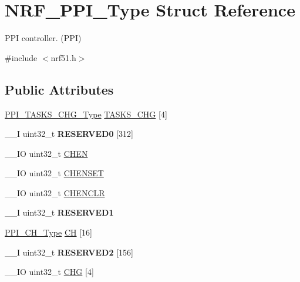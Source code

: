 \hypertarget{struct_n_r_f___p_p_i___type}{}\section{N\+R\+F\+\_\+\+P\+P\+I\+\_\+\+Type Struct Reference}
\label{struct_n_r_f___p_p_i___type}


P\+P\+I controller. (P\+P\+I)  




{\ttfamily \#include $<$nrf51.\+h$>$}

\subsection*{Public Attributes}
\begin{DoxyCompactItemize}
\item 
\hyperlink{struct_p_p_i___t_a_s_k_s___c_h_g___type}{P\+P\+I\+\_\+\+T\+A\+S\+K\+S\+\_\+\+C\+H\+G\+\_\+\+Type} \hyperlink{struct_n_r_f___p_p_i___type_a16a82ced7f5dfaf384b24f08e41b8407}{T\+A\+S\+K\+S\+\_\+\+C\+H\+G} \mbox{[}4\mbox{]}
\item 
\hypertarget{struct_n_r_f___p_p_i___type_a58f2e53a8e31e9214dd9f19cb3c85f42}{}\+\_\+\+\_\+\+I uint32\+\_\+t {\bfseries R\+E\+S\+E\+R\+V\+E\+D0} \mbox{[}312\mbox{]}\label{struct_n_r_f___p_p_i___type_a58f2e53a8e31e9214dd9f19cb3c85f42}

\item 
\+\_\+\+\_\+\+I\+O uint32\+\_\+t \hyperlink{struct_n_r_f___p_p_i___type_a592334d1718038cea99b96c44ff804d6}{C\+H\+E\+N}
\item 
\+\_\+\+\_\+\+I\+O uint32\+\_\+t \hyperlink{struct_n_r_f___p_p_i___type_a6b36decd8a32c616b73b51681e6e302c}{C\+H\+E\+N\+S\+E\+T}
\item 
\+\_\+\+\_\+\+I\+O uint32\+\_\+t \hyperlink{struct_n_r_f___p_p_i___type_a2406f118ccab3f9c493a3c70445a97dc}{C\+H\+E\+N\+C\+L\+R}
\item 
\hypertarget{struct_n_r_f___p_p_i___type_a193e79359d3ff0337484675ad23d8c12}{}\+\_\+\+\_\+\+I uint32\+\_\+t {\bfseries R\+E\+S\+E\+R\+V\+E\+D1}\label{struct_n_r_f___p_p_i___type_a193e79359d3ff0337484675ad23d8c12}

\item 
\hyperlink{struct_p_p_i___c_h___type}{P\+P\+I\+\_\+\+C\+H\+\_\+\+Type} \hyperlink{struct_n_r_f___p_p_i___type_ab7c91bb1064e971a19241565d10faf2c}{C\+H} \mbox{[}16\mbox{]}
\item 
\hypertarget{struct_n_r_f___p_p_i___type_af392d25ea827d9cf608596288fb48645}{}\+\_\+\+\_\+\+I uint32\+\_\+t {\bfseries R\+E\+S\+E\+R\+V\+E\+D2} \mbox{[}156\mbox{]}\label{struct_n_r_f___p_p_i___type_af392d25ea827d9cf608596288fb48645}

\item 
\+\_\+\+\_\+\+I\+O uint32\+\_\+t \hyperlink{struct_n_r_f___p_p_i___type_a2f326718b35b630ed41246c642f4de41}{C\+H\+G} \mbox{[}4\mbox{]}
\end{DoxyCompactItemize}


